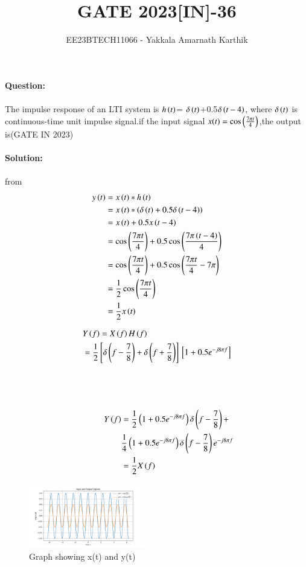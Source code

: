 \documentclass[journal,12pt,twocolumn]{IEEEtran}
\begin{document}


\title{GATE 2023[IN]-36}
\author{EE23BTECH11066 - Yakkala Amarnath Karthik}
\maketitle

\textbf{Question:}\\ \\
The impulse response of an LTI system is $h\left(t\right)$= $\delta\left(t\right)$+0.5$ \delta\left(t-4\right)$, where $\delta\left(t\right)$ is continuous-time unit impulse signal.if the input signal $x(t)=\cos\left(\frac{7\pi t}{4}\right)$,the output is\hfill(GATE IN 2023)\\ \\

\textbf{Solution:}\\
\\
 from 
\begin{align}
    y\left(t\right) &=x\left(t\right) * h\left(t\right)\\
            &=x\left(t\right) * \left(\delta\left(t\right)+0.5 \delta\left(t-4\right)\right)\\
            &=x\left(t\right)+0.5x\left(t-4\right)\\
            &=\cos\left(\frac{7\pi t}{4}\right)+0.5\cos\left(\frac{7\pi \left(t-4\right)}{4}\right)\\
            &=\cos\left(\frac{7\pi t}{4}\right)+0.5\cos\left(\frac{7\pi t}{4}-7\pi\right)\\
            &=\frac{1}{2}\cos\left(\frac{7\pi t}{4}\right)\\
            &=\frac{1}{2}x\left(t\right)
\end{align}

\begin{align}
    &Y\left(f\right) = X\left(f\right)H\left(f\right)\\
   &=\frac{1}{2}{}\left[\delta \left(f-\frac{7}{8}\right)+\delta \left(f+\frac{7}{8}\right)\right]{}\left[1+0.5e^{-j8\pi f}\right]
         \end{align} \\ \\ \\
 \vspace{10cm}
\begin{align}
  \hspace{1cm}Y\left(f\right) &=\frac{1}{2}\left(1+0.5e^{-j8\pi f}\right)\delta \left(f-\frac{7}{8}\right)+\nonumber\\
   &\frac{1}{4}\left(1+0.5e^{-j8\pi f}\right)\delta \left(f-\frac{7}{8}\right)e^{-j8\pi f}\\
   &=\frac{1}{2}X\left(f\right)
\end{align}

\begin{figure}[ht]
    \centering
    \includegraphics[width=0.45\textwidth]{figs/pythongate.png}
    \caption{Graph showing x(t) and y(t)}
\end{figure}
\end{document}
